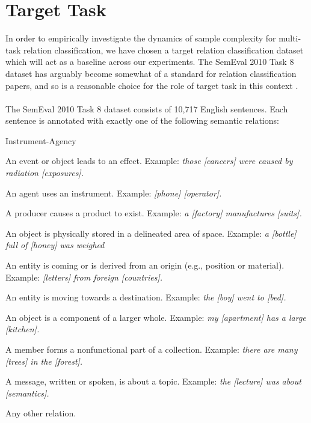 \section{Target Task}
In order to empirically investigate the dynamics of sample complexity for multi-task relation classification, we have chosen a target relation classification dataset which will act as a baseline across our experiments. The SemEval 2010 Task 8 dataset has arguably become somewhat of a standard for relation classification papers, and so is a reasonable choice for the role of target task in this context \citep{hendrickx2009}.
\\\\
The SemEval 2010 Task 8 dataset consists of 10,717 English sentences. Each sentence is annotated with exactly one of the following semantic relations:

\begin{labeling}{Instrument-Agency}
	\item [\textbf{Cause-Effect}] An event or object leads to an
effect. Example: \emph{those [cancers] were caused
by radiation [exposures].}
	\item [\textbf{Instrument-Agency}] An agent uses an instrument. Example: \emph{[phone] [operator].}
	\item [\textbf{Product-Producer}] A producer causes a product to exist. Example: \emph{a [factory] manufactures [suits].}
	\item [\textbf{Content-Container}] An object is physically stored in a delineated area of space. Example: \emph{a [bottle] full of [honey] was weighed}
	\item [\textbf{Entity-Origin}] An entity is coming or is derived from an origin (e.g., position or material). Example: \emph{[letters] from foreign [countries].}
	\item [\textbf{Entity-Destination}] An entity is moving towards a destination. Example: \emph{the [boy] went to [bed].}
	\item [\textbf{Component-Whole}] An object is a component of a larger whole. Example: \emph{my [apartment] has a large [kitchen].}
	\item [\textbf{Member-Collection}] A member forms a nonfunctional part of a collection. Example: \emph{there are many [trees] in the [forest].}
	\item [\textbf{Message-Topic}] A message, written or spoken, is about a topic. Example: \emph{the [lecture] was about [semantics].}
	\item [\textbf{Other}] Any other relation.
\end{labeling}


